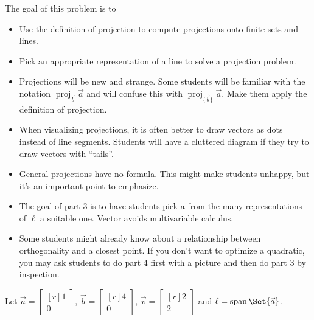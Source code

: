 \documentclass{problemset}
\DeclareMathOperator{\Span}{span}
\DeclareMathOperator{\Proj}{proj}
\newcommand{\mat}[1]{\begin{bmatrix*}[r]#1\end{bmatrix*}}
\begin{document}
	\question
	\begin{annotation}
		\begin{goals}

			The goal of this problem is to
			\begin{itemize}
				\item Use the definition of projection to compute projections onto finite sets and lines.
				\item Pick an appropriate representation of a line to solve a projection problem.
			\end{itemize}
		\end{goals}
		\begin{notes}
			\begin{itemize}
				\item Projections will be new and strange. Some students will be familiar with
					the notation $\Proj_{\vec b}\vec a$ and will confuse this
					with $\Proj_{\{\vec b\}}\vec a$. Make them apply the definition of projection.
				\item When visualizing projections, it is often better to draw vectors as dots instead
					of line segments. Students will have a cluttered diagram if they try to
					draw vectors with ``tails''.
				\item General projections have no formula. This might make students unhappy, but it's an
					important point to emphasize.
				\item The goal of part 3 is to have students pick a from the many representations of $\ell$
					a suitable one. Vector avoids multivariable calculus.

				\item Some students might already know about a relationship between orthogonality and
					a closest point. If you don't want to optimize a quadratic,
					you may ask students to do part 4 first with a picture and then do part 3 by inspection.
			\end{itemize}
		\end{notes}
	\end{annotation}
	Let $\vec a=\mat{1\\0}$, $\vec b=\mat{4\\0}$, $\vec v=\mat{2\\2}$ and
	$\ell=\Span\Set{\vec a}$.
\end{document}
